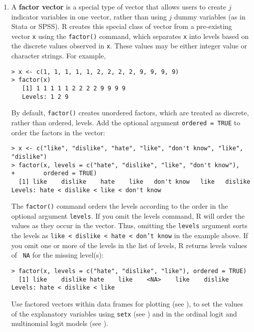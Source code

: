 \begin{enumerate}
\item \label{factors} A {\bf factor vector} is a special type of
vector that allows users to create $j$ indicator variables in one
vector, rather than using $j$ dummy variables (as in Stata or SPSS).  R
creates this special class of vector from a pre-existing vector {\tt x}
using the {\tt factor()} command, which separates {\tt x} into levels
based on the discrete values observed in {\tt x}.  These values may be
either integer value or character strings.  For example,
\begin{verbatim}
> x <- c(1, 1, 1, 1, 1, 2, 2, 2, 2, 9, 9, 9, 9)
> factor(x)
   [1] 1 1 1 1 1 2 2 2 2 9 9 9 9
   Levels: 1 2 9
\end{verbatim}
By default, {\tt factor()} creates unordered factors, which are
  treated as discrete, rather than ordered, levels.  Add the optional
  argument {\tt ordered = TRUE} to order the factors in the vector:
\begin{verbatim}  
> x <- c("like", "dislike", "hate", "like", "don't know", "like", "dislike")
> factor(x, levels = c("hate", "dislike", "like", "don't know"),
+        ordered = TRUE)
  [1] like    dislike    hate    like   don't know   like   dislike   
Levels: hate < dislike < like < don't know
\end{verbatim}
  The {\tt factor()} command orders the levels according to the order in
  the optional argument {\tt levels}.  If you omit the levels command,
  R will order the values as they occur in the vector.  Thus, omitting
  the {\tt levels} argument sorts the levels as {\tt like < dislike <
    hate < don't know} in the example above.  If you omit one or more
  of the levels in the list of levels, R returns levels values of {\tt
    NA} for the missing level(s):
\begin{verbatim}
> factor(x, levels = c("hate", "dislike", "like"), ordered = TRUE)
  [1] like    dislike hate    like    <NA>    like    dislike
Levels: hate < dislike < like
\end{verbatim}
Use factored vectors within data frames for plotting (see
), to set the values of the explanatory variables using
{\tt setx} (see ) and in the ordinal logit and multinomial
logit models (see ).  


\end{enumerate}
